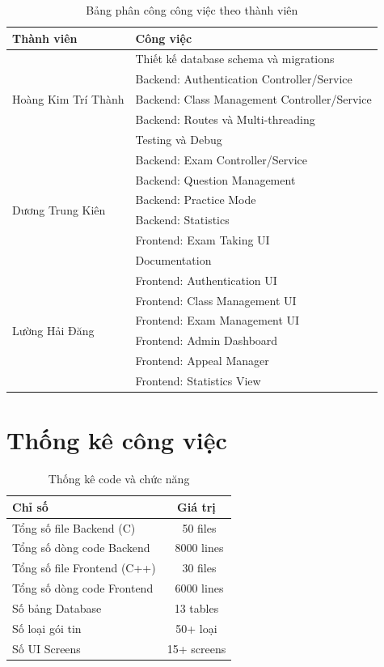 \documentclass[12pt,a4paper]{report}
\begin{document}
\begin{table}[h]
\centering
\caption{Bảng phân công công việc theo thành viên}
\begin{tabular}{|p{4cm}|p{10cm}|}
\hline
\textbf{Thành viên} & \textbf{Công việc} \\
\hline
\multirow{5}{*}{Hoàng Kim Trí Thành} 
& Thiết kế database schema và migrations \\
& Backend: Authentication Controller/Service \\
& Backend: Class Management Controller/Service \\
& Backend: Routes và Multi-threading \\
& Testing và Debug \\
\hline
\multirow{6}{*}{Dương Trung Kiên}
& Backend: Exam Controller/Service \\
& Backend: Question Management \\
& Backend: Practice Mode \\
& Backend: Statistics \\
& Frontend: Exam Taking UI \\
& Documentation \\
\hline
\multirow{6}{*}{Lường Hải Đăng}
& Frontend: Authentication UI \\
& Frontend: Class Management UI \\
& Frontend: Exam Management UI \\
& Frontend: Admin Dashboard \\
& Frontend: Appeal Manager \\
& Frontend: Statistics View \\
\hline
\end{tabular}
\end{table}

\section{Thống kê công việc}

\begin{table}[h]
\centering
\caption{Thống kê code và chức năng}
\begin{tabular}{|l|c|}
\hline
\textbf{Chỉ số} & \textbf{Giá trị} \\
\hline
Tổng số file Backend (C) & ~50 files \\
Tổng số dòng code Backend & ~8000 lines \\
Tổng số file Frontend (C++) & ~30 files \\
Tổng số dòng code Frontend & ~6000 lines \\
Số bảng Database & 13 tables \\
Số loại gói tin & 50+ loại \\
Số UI Screens & 15+ screens \\
\hline
\end{tabular}
\end{table}
\end{document}

